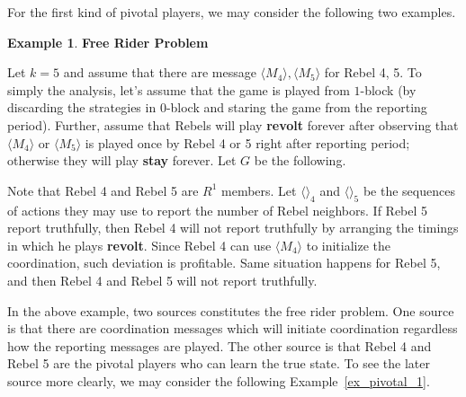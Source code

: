 \documentclass[12pt,letter]{article}
\theoremstyle{definition}
\newtheorem{example}{Example}[section]
\theoremstyle{remark}
\theoremstyle{claim}
\begin{document}
For the first kind of pivotal players, we may consider the following two examples.

\begin{example} \label{ex_free_rider_tree}\textbf{Free Rider Problem}

Let $k=5$ and assume that there are message $\langle M_4 \rangle,\langle M_5 \rangle$ for Rebel 4, 5. To simply the analysis, let's assume that the game is played from $1$-block (by discarding the strategies in $0$-block and staring the game from the reporting period). Further, assume that Rebels will play \textbf{revolt} forever after observing that $\langle M_4 \rangle$ or $\langle M_5 \rangle$ is played once by Rebel 4 or 5 right after reporting period; otherwise they will play \textbf{stay} forever. Let $G$ be the following.

\begin{center}
\end{center}

Note that Rebel 4 and Rebel 5 are $R^1$ members. Let $\langle \rangle_4$ and $\langle \rangle_5$ be the sequences of actions they may use to report the number of Rebel neighbors. If Rebel 5 report truthfully, then Rebel 4 will not report truthfully by arranging the timings in which he plays \textbf{revolt}. Since Rebel 4 can use $\langle M_4 \rangle$ to initialize the coordination, such deviation is profitable. Same situation happens for Rebel 5, and then Rebel 4 and Rebel 5 will not report truthfully.

\end{example}

In the above example, two sources constitutes the free rider problem. One source is that there are coordination messages which will initiate coordination regardless how the reporting messages are played. The other source is that Rebel 4 and Rebel 5 are the pivotal players who can learn the true state. To see the later source more clearly, we may consider the following Example~\ref{ex_pivotal_1}.
\end{document}
